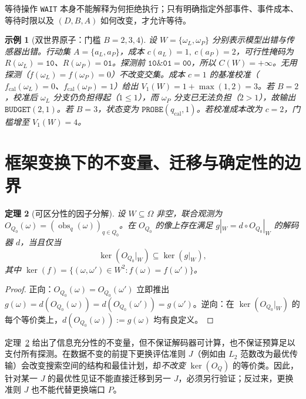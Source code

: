 \documentclass[11pt,a4paper]{article}
\theoremstyle{preprintthm}
\newtheorem{theorem}{定理}[section]
\theoremstyle{preprintdef}
\newtheorem{example}[theorem]{示例}
\newcommand{\kerrel}{\operatorname{ker}}
\newcommand{\obs}{\operatorname{obs}}
\begin{document}
等待操作 \texttt{WAIT} 本身不能解释为何拒绝执行；只有明确指定外部事件、事件成本、等待时限以及 $(D,B,A)$ 如何改变，才允许等待。

\begin{example}[双世界原子：门槛 $B=2,3,4$]
设 $W=\{\omega_L,\omega_P\}$ 分别表示模型出错与传感器出错。行动集 $A=\{a_L,a_P\}$，成本 $c(a_L)=1,\ c(a_P)=2$，可行性掩码为 $R(\omega_L)=\texttt{10}$、$R(\omega_P)=\texttt{01}$。探测前 $\texttt{10}\mathbin{\&}\texttt{01}=\texttt{00}$，所以 $C(W)=+\infty$。无用探测（$f(\omega_L)=f(\omega_P)=0$）不改变交集。成本 $c=1$ 的基准校准（$f_{\mathrm{cal}}(\omega_L)=0$、$f_{\mathrm{cal}}(\omega_P)=1$）给出 $V_1(W)=1+\max(1,2)=3$。若 $B=2$，校准后 $\omega_L$ 分支仍负担得起（$1\le1$），而 $\omega_P$ 分支已无法负担（$2>1$），故输出 $\texttt{BUDGET}(2,1)$。若 $B=3$，状态变为 $\texttt{PROBE}(q_{\mathrm{cal}},1)$。若校准成本改为 $c=2$，门槛增至 $V_1(W)=4$。
\end{example}

\section{框架变换下的不变量、迁移与确定性的边界}

\begin{theorem}[可区分性的因子分解]
\label{thm:factorization}
设 $W\subseteq\Omega$ 非空，联合观测为 $O_{Q_0}(\omega)=(\obs_q(\omega))_{q\in Q_0}$。在 $O_{Q_0}$ 的像上存在满足 $g|_W=d\circ O_{Q_0}|_W$ 的解码器 $d$，当且仅当
\begin{equation}
  \kerrel(O_{Q_0}|_W)\subseteq\kerrel(g|_W),
\end{equation}
其中 $\kerrel(f)=\{(\omega,\omega')\in W^2:f(\omega)=f(\omega')\}$。
\end{theorem}
\begin{proof}
正向：$O_{Q_0}(\omega)=O_{Q_0}(\omega')$ 立即推出 $g(\omega)=d(O_{Q_0}(\omega))=d(O_{Q_0}(\omega'))=g(\omega')$。逆向：在 $\kerrel(O_{Q_0}|_W)$ 的每个等价类上，$d(O_{Q_0}(\omega)):=g(\omega)$ 均有良定义。
\end{proof}

定理~\ref{thm:factorization} 给出了信息充分性的不变量，但不保证解码器可计算，也不保证预算足以支付所有探测。在数据不变的前提下更换评估准则 $J$（例如由 $L_2$ 范数改为最优传输）会改变搜索空间的结构和最佳计划，却\emph{不改变} $\kerrel(O_Q)$ 的等价类。因此，针对某一 $J$ 的最优性见证不能直接迁移到另一 $J$，必须另行验证；反过来，更换准则 $J$ 也不能代替更换端口 $P$。
\end{document}
